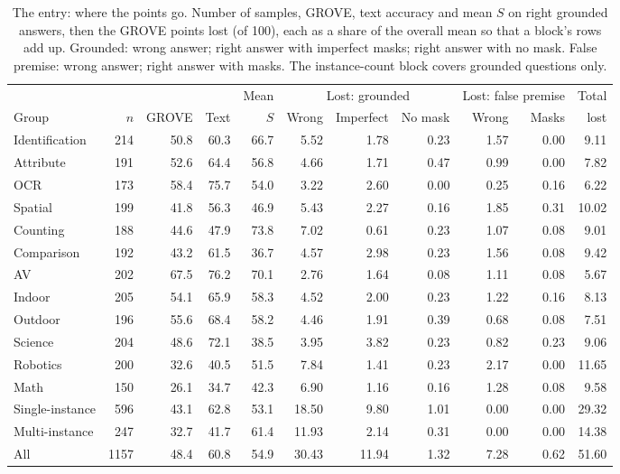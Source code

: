 \documentclass{article}
\newcommand{\ours}{\rowcolor{oursbg}}
\begin{document}
\begin{table}[!htbp]
\centering\scriptsize
\setlength{\tabcolsep}{4pt}
\caption{The entry: where the points go. Number of samples, GROVE, text accuracy and mean $S$ on right grounded answers, then the GROVE
points lost (of 100), each as a share of the overall mean so that a block's rows add up. Grounded: wrong answer; right answer with
imperfect masks; right answer with no mask. False premise: wrong answer; right answer with masks. The instance-count block covers
grounded questions only.}
\label{tab:loss}
\begin{tabular}{lrrrrrrrrrr}
\toprule
 & & & & Mean & \multicolumn{3}{c}{Lost: grounded} & \multicolumn{2}{c}{Lost: false premise} & Total \\
Group & $n$ & GROVE & Text & $S$ & Wrong & Imperfect & No mask & Wrong & Masks & lost \\
\midrule
Identification & 214 & 50.8 & 60.3 & 66.7 & 5.52 & 1.78 & 0.23 & 1.57 & 0.00 & 9.11 \\
Attribute & 191 & 52.6 & 64.4 & 56.8 & 4.66 & 1.71 & 0.47 & 0.99 & 0.00 & 7.82 \\
OCR & 173 & 58.4 & 75.7 & 54.0 & 3.22 & 2.60 & 0.00 & 0.25 & 0.16 & 6.22 \\
Spatial & 199 & 41.8 & 56.3 & 46.9 & 5.43 & 2.27 & 0.16 & 1.85 & 0.31 & 10.02 \\
Counting & 188 & 44.6 & 47.9 & 73.8 & 7.02 & 0.61 & 0.23 & 1.07 & 0.08 & 9.01 \\
Comparison & 192 & 43.2 & 61.5 & 36.7 & 4.57 & 2.98 & 0.23 & 1.56 & 0.08 & 9.42 \\
\midrule
AV & 202 & 67.5 & 76.2 & 70.1 & 2.76 & 1.64 & 0.08 & 1.11 & 0.08 & 5.67 \\
Indoor & 205 & 54.1 & 65.9 & 58.3 & 4.52 & 2.00 & 0.23 & 1.22 & 0.16 & 8.13 \\
Outdoor & 196 & 55.6 & 68.4 & 58.2 & 4.46 & 1.91 & 0.39 & 0.68 & 0.08 & 7.51 \\
Science & 204 & 48.6 & 72.1 & 38.5 & 3.95 & 3.82 & 0.23 & 0.82 & 0.23 & 9.06 \\
Robotics & 200 & 32.6 & 40.5 & 51.5 & 7.84 & 1.41 & 0.23 & 2.17 & 0.00 & 11.65 \\
Math & 150 & 26.1 & 34.7 & 42.3 & 6.90 & 1.16 & 0.16 & 1.28 & 0.08 & 9.58 \\
\midrule
Single-instance & 596 & 43.1 & 62.8 & 53.1 & 18.50 & 9.80 & 1.01 & 0.00 & 0.00 & 29.32 \\
Multi-instance & 247 & 32.7 & 41.7 & 61.4 & 11.93 & 2.14 & 0.31 & 0.00 & 0.00 & 14.38 \\
\midrule
\ours All & 1157 & 48.4 & 60.8 & 54.9 & 30.43 & 11.94 & 1.32 & 7.28 & 0.62 & 51.60 \\
\bottomrule
\end{tabular}
\end{table}
\end{document}
